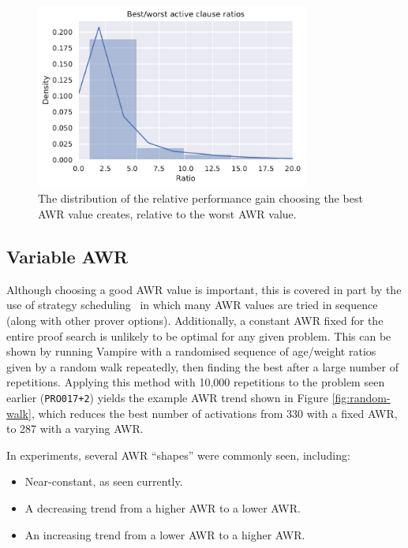 \documentclass{llncs}
\begin{document}
\begin{figure}
	\centering
	\includegraphics[width=0.8\textwidth]{optimal-awr-improvement}
	\caption{The distribution of the relative performance gain choosing the best AWR value creates, relative to the worst AWR value.}
	\label{fig:optimal-awr-improvement}
\end{figure}


\subsection{Variable AWR}
Although choosing a good AWR value is important, this is covered in part by the use of strategy scheduling~\cite{CADE18} in which many AWR values are tried in sequence (along with other prover options).
Additionally, a constant AWR fixed for the entire proof search is unlikely to be optimal for any given problem.
This can be shown by running Vampire with a randomised sequence of age/weight ratios given by a random walk repeatedly, then finding the best after a large number of repetitions.
Applying this method with 10,000 repetitions to the problem seen earlier (\texttt{PRO017+2}) yields the example AWR trend shown in Figure \ref{fig:random-walk}, which reduces the best number of activations from 330 with a fixed AWR, to 287 with a varying AWR.

In experiments, several AWR ``shapes'' were commonly seen, including:
\begin{itemize}
	\item Near-constant, as seen currently.
	\item A decreasing trend from a higher AWR to a lower AWR.
	\item An increasing trend from a lower AWR to a higher AWR.
\end{itemize}
\end{document}
